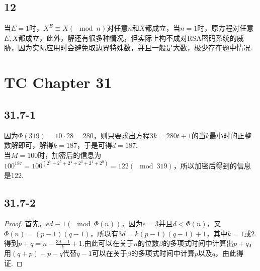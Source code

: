 \documentclass[twocolumn]{article}
\newenvironment{SChinese}{
	\CJKfamily{gbsn}
	\CJKtilde
	\CJKnospace}{}
\begin{document}
\begin{CJK}{UTF8}{}
\begin{SChinese}
			\subsection*{12}
				当$E=1$时，$X^E\equiv X(\mod n)$对任意$n$和$X$都成立，当$n=1$时，原方程对任意$E,X$都成立，此外，解还有很多种情况，但实际上构不成对RSA密码系统的威胁，因为实际应用时会避免取边界特殊数，并且一般是大数，极少存在题中情况.
			\section*{TC Chapter 31}
			\subsection*{31.7-1}
				因为$\Phi(319)=10\cdot28=280$，则只要求出方程$3k=280t+1$的当$k$最小时的正整数解即可，解得$k=187$，于是可得$d=187$.\\
				当$M=100$时，加密后的信息为$100^{187}=100^{(2^7+2^5+2^4+2^3+2^1+2^0)}=122(\mod319)$，所以加密后得到的信息是122.
			\subsection*{31.7-2}
				\begin{proof}
					首先，$ed\equiv1(\mod\Phi(n))$，因为$e=3$并且$d<\Phi(n)$，又$\Phi(n)=(p-1)(q-1)$，所以有$3d=k(p-1)(q-1)+1$，其中$k=1$或2.得到$p+q=n-\frac{3d-1}{k}+1$.由此可以在关于$n$的位数$\beta$的多项式时间中计算出$p+q$，用$(q+p)-p-q$代替$q-1$可以在关于$\beta$的多项式时间中计算$p$以及$q$，由此得证.
				\end{proof}

\end{SChinese}
\end{CJK}
\end{document}
